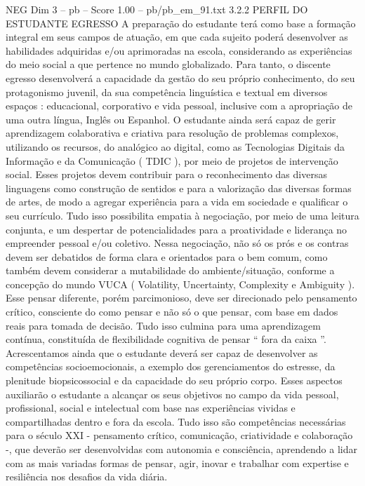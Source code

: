 \begin{textsample}{NEG Dim 3 – pb – Score 1.00 – pb/pb\_em\_91.txt}  \label{ex:f3_neg_203}
3.2.2 PERFIL DO ESTUDANTE EGRESSO A preparação do estudante terá como base a formação integral em seus campos de atuação, em que cada sujeito poderá desenvolver as habilidades adquiridas e/ou aprimoradas na escola, considerando as experiências do meio social a que pertence no mundo globalizado.
Para tanto, o discente egresso desenvolverá a capacidade da gestão do seu próprio conhecimento, do seu protagonismo juvenil, da sua competência linguística e textual em diversos espaços : educacional, corporativo e vida pessoal, inclusive com a apropriação de uma outra língua, Inglês ou Espanhol.
O estudante ainda será capaz de gerir aprendizagem colaborativa e criativa para resolução de problemas complexos, utilizando os recursos, do analógico ao digital, como as Tecnologias Digitais da Informação e da Comunicação ( TDIC ), por meio de projetos de intervenção social.
Esses projetos devem contribuir para o reconhecimento das diversas linguagens como construção de sentidos e para a valorização das diversas formas de artes, de modo a agregar experiência para a vida em sociedade e qualificar o seu currículo.
Tudo isso possibilita empatia à negociação, por meio de uma leitura conjunta, e um despertar de potencialidades para a proatividade e liderança no empreender pessoal e/ou coletivo.
Nessa negociação, não só os prós e os contras devem ser debatidos de forma clara e orientados para o bem comum, como também devem considerar a mutabilidade do ambiente/situação, conforme a concepção do mundo VUCA ( Volatility, Uncertainty, Complexity e Ambiguity ).
Esse pensar diferente, porém parcimonioso, deve ser direcionado pelo pensamento crítico, consciente do como pensar e não só o que pensar, com base em dados reais para tomada de decisão.
Tudo isso culmina para uma aprendizagem contínua, constituída de flexibilidade cognitiva de pensar “ fora da caixa ”.
Acrescentamos ainda que o estudante deverá ser capaz de desenvolver as competências socioemocionais, a exemplo dos gerenciamentos do estresse, da plenitude biopsicossocial e da capacidade do seu próprio corpo.
Esses aspectos auxiliarão o estudante a alcançar os seus objetivos no campo da vida pessoal, profissional, social e intelectual com base nas experiências vividas e compartilhadas dentro e fora da escola.
Tudo isso são competências necessárias para o século XXI - pensamento crítico, comunicação, criatividade e colaboração -, que deverão ser desenvolvidas com autonomia e consciência, aprendendo a lidar com as mais variadas formas de pensar, agir, inovar e trabalhar com expertise e resiliência nos desafios da vida diária.

\end{textsample}
